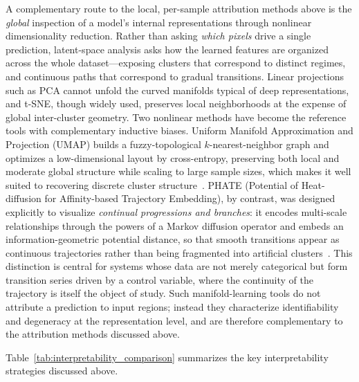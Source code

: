 \documentclass[letterpaper, 12, one column]{article}
\begin{document}
{\color[rgb]{0,0,1}A complementary route to the local, per-sample attribution methods above is the \emph{global} inspection of a model's internal representations through nonlinear dimensionality reduction. Rather than asking \emph{which pixels} drive a single prediction, latent-space analysis asks how the learned features are organized across the whole dataset---exposing clusters that correspond to distinct regimes, and continuous paths that correspond to gradual transitions. Linear projections such as PCA cannot unfold the curved manifolds typical of deep representations, and t-SNE, though widely used, preserves local neighborhoods at the expense of global inter-cluster geometry. Two nonlinear methods have become the reference tools with complementary inductive biases. Uniform Manifold Approximation and Projection (UMAP) builds a fuzzy-topological $k$-nearest-neighbor graph and optimizes a low-dimensional layout by cross-entropy, preserving both local and moderate global structure while scaling to large sample sizes, which makes it well suited to recovering discrete cluster structure~\cite{ghojogh2021uniform}. PHATE (Potential of Heat-diffusion for Affinity-based Trajectory Embedding), by contrast, was designed explicitly to visualize \emph{continual progressions and branches}: it encodes multi-scale relationships through the powers of a Markov diffusion operator and embeds an information-geometric potential distance, so that smooth transitions appear as continuous trajectories rather than being fragmented into artificial clusters~\cite{moon2019phate}. This distinction is central for systems whose data are not merely categorical but form transition series driven by a control variable, where the continuity of the trajectory is itself the object of study. Such manifold-learning tools do not attribute a prediction to input regions; instead they characterize identifiability and degeneracy at the representation level, and are therefore complementary to the attribution methods discussed above.}

Table~\ref{tab:interpretability_comparison} summarizes the key interpretability strategies discussed above.
\end{document}
